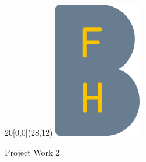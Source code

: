 %
%

\begin{titlepage}


\setlength{\unitlength}{1mm}
\begin{textblock}{20}[0,0](28,12)
	\includegraphics[scale=1.0]{images/BFH_Logo_B.png}
\end{textblock}

\color{black}

\begin{flushleft}

\vspace*{50mm}

\begin{center}
	\fontsize{20pt}{22pt}\selectfont
	Project Work 2 \\		%
\end{center}
\vspace{5mm}
\fontsize{26pt}{28pt}\selectfont 
\heading				\\							%
\vspace{2mm}

\fontsize{10pt}{12pt}\selectfont

\vspace{3mm}



\end{flushleft}
\end{titlepage}
